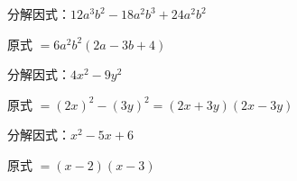 \documentclass[a4paper,12pt]{ctexart}
\begin{document}


\begin{example}
分解因式：$12a^3b^2-18a^2b^3+24a^2b^2$
\end{example}
\begin{solution}
原式 $=6a^2b^2(2a-3b+4)$
\end{solution}

\begin{example}
分解因式：$4x^2-9y^2$
\end{example}
\begin{solution}
原式 $=(2x)^2-(3y)^2=(2x+3y)(2x-3y)$
\end{solution}

\begin{example}
分解因式：$x^2-5x+6$
\end{example}
\begin{solution}
原式 $=(x-2)(x-3)$
\end{solution}

\end{document}

